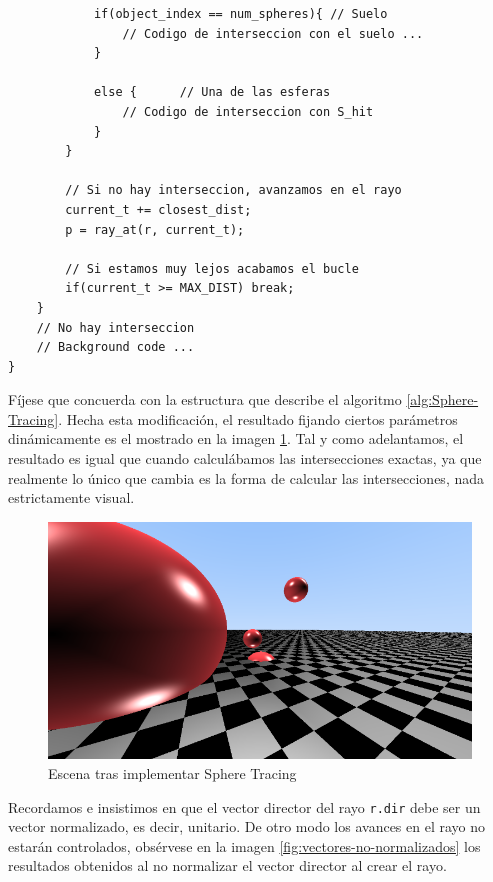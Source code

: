 \begin{lstlisting}
            if(object_index == num_spheres){ // Suelo
                // Codigo de interseccion con el suelo ...
            }

            else {      // Una de las esferas
                // Codigo de interseccion con S_hit
            }
        }

        // Si no hay interseccion, avanzamos en el rayo
        current_t += closest_dist;
        p = ray_at(r, current_t);

        // Si estamos muy lejos acabamos el bucle
        if(current_t >= MAX_DIST) break;
    }
    // No hay interseccion
    // Background code ...       
}
\end{lstlisting}

Fíjese que concuerda con la estructura que describe el algoritmo \ref{alg:Sphere-Tracing}. Hecha esta modificación, el resultado fijando ciertos parámetros dinámicamente es el mostrado en la imagen \ref{fig:esferas-ST}. Tal y como adelantamos, el resultado es igual que cuando calculábamos las intersecciones exactas, ya que realmente lo único que cambia es la forma de calcular las intersecciones, nada estrictamente visual.

\begin{figure} [ht]
    \centering
    \includegraphics[scale = 0.37]{img/C8/esferas-ray-marching.png}
    \caption{Escena tras implementar Sphere Tracing}
    \label{fig:esferas-ST}
\end{figure}

Recordamos e insistimos en que el vector director del rayo \verb|r.dir| debe ser un vector normalizado, es decir, unitario. De otro modo los avances en el rayo no estarán controlados, obsérvese en la imagen \ref{fig:vectores-no-normalizados} los resultados obtenidos al no normalizar el vector director al crear el rayo.


